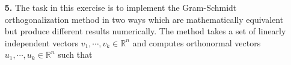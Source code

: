 \documentclass[10pt]{report}
\begin{document}
\begin{enumerate}
%
%
%
%



%
%
%


 \item[\textbf{5.}]
 The task in this exercise is to implement the Gram-Schmidt
  orthogonalization method in two ways which are mathematically equivalent but
  produce different results numerically. The method takes a set of linearly
  independent vectors $v_1,\cdots,v_k\in\mathbb{R}^n$ and computes
  orthonormal vectors $u_1,\cdots,u_k\in\mathbb{R}^n$ such that 
\end{enumerate}
\end{document}

